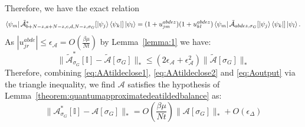 \documentclass[aps,floatfix,10pt,amssymb,amsfont,amsmath,superscriptaddress,float,nofootinbib,longbibliography,nobalancelastpage,twocolumn]{revtex4-2}
\begin{document}
Therefore, we have the exact relation
\begin{equation}
  \bra{\psi_m}\tilde{\mathcal{A}}^*_{b+N-z,a+N-z,e,d,N-z,\sigma_G}[\ket{\psi_j}\bra{\psi_k}]\ket{\psi_l} 
   =(1+u_{jm}^{abdez})(1+u_{kl}^{abdez})\bra{\psi_m}\tilde{\mathcal{A}}_{abdez,\sigma_G}[\ket{\psi_j}\bra{\psi_k}]\ket{\psi_l}.
\end{equation}
As $|u_{jr}^{abde}| \leq \epsilon_{\mathcal{A}} = O(\frac{\beta \mu}{Nt})$ by Lemma~\ref{lemma:1}  we have:
\begin{equation}
    \|\tilde{\mathcal{A}}^*_{\sigma_G}[\mathbb{I}] - \tilde{\mathcal{A}}[\sigma_G]\|_* \leq (2\epsilon_{\mathcal{A}}+ \epsilon_{\mathcal{A}}^2)\|\tilde{\mathcal{A}}[\sigma_G]\|_*
    \label{eq:Aoutput}
\end{equation}
Therefore, combining \eqref{eq:AAtildeclose1}, \eqref{eq:AAtildeclose2} and \eqref{eq:Aoutput} via the triangle inequality, we find $\mathcal{A}$ satisfies the hypothesis of Lemma~\ref{theorem:quantumapproximatedeatildedbalance} as:
\begin{equation}
    \|\mathcal{A}^*_{\sigma_G}[\mathbb{I}] - \mathcal{A}[\sigma_G]\|_* = O\!\left(\frac{\beta\mu}{Nt}\right)\|\mathcal{A}[\sigma_G]\|_* + O\!\left(\epsilon_{\Delta}\right)
\end{equation}
\end{document}
